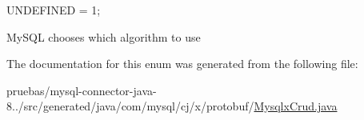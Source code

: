 {\ttfamily U\+N\+D\+E\+F\+I\+N\+ED = 1;}


\begin{DoxyPre}
MySQL chooses which algorithm to use
\end{DoxyPre}
 

The documentation for this enum was generated from the following file\+:\begin{DoxyCompactItemize}
\item 
pruebas/mysql-\/connector-\/java-\/8../src/generated/java/com/mysql/cj/x/protobuf/\mbox{\hyperlink{_mysqlx_crud_8java}{Mysqlx\+Crud.\+java}}\end{DoxyCompactItemize}
